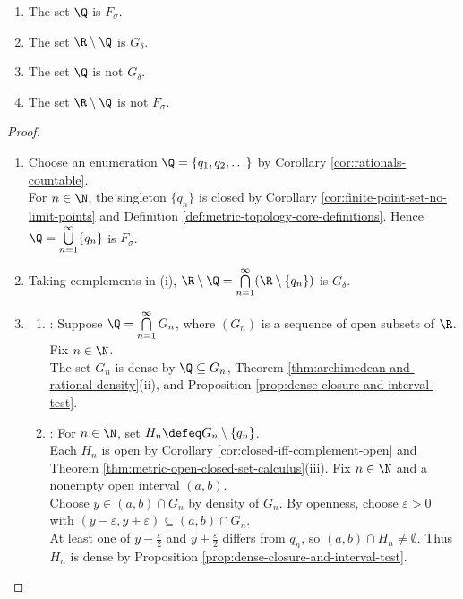 \begin{corollary} \label{cor:rationals-not-gdelta-irrationals-not-fsigma} 
\begin{enumerate}[label=(\roman*)]
\setlength{\itemsep}{0pt}
\item The set $\Q$ is $F_\sigma$.
\item The set $\R\setminus\Q$ is $G_\delta$.
\item The set $\Q$ is not $G_\delta$.
\item The set $\R\setminus\Q$ is not $F_\sigma$.
\end{enumerate}
\begin{proof}
\begin{enumerate}[label=(\roman*)]
\setlength{\itemsep}{0pt}
\item Choose an enumeration $\Q=\{q_1,q_2,\ldots\}$ by Corollary \ref{cor:rationals-countable}.\\
For $n\in\N$, the singleton $\{q_n\}$ is closed by Corollary \ref{cor:finite-point-set-no-limit-points} and Definition \ref{def:metric-topology-core-definitions}. Hence $\Q=\bigcup\limits_{n=1}^{\infty}\{q_n\}$ is $F_\sigma$.
\item Taking complements in (i), $\R\setminus\Q=\bigcap\limits_{n=1}^{\infty}(\R\setminus\{q_n\})$ is $G_\delta$.
\item
\begin{enumerate}[label=(\alph*)]
\setlength{\itemsep}{0pt}
\item {}: Suppose $\Q=\bigcap\limits_{n=1}^{\infty}G_n$, where $(G_n)$ is a sequence of open subsets of $\R$. Fix $n\in\N$.\\
The set $G_n$ is dense by $\Q\subseteq G_n$, Theorem \ref{thm:archimedean-and-rational-density}(ii), and Proposition \ref{prop:dense-closure-and-interval-test}.
\item {}: For $n\in\N$, set $H_n\defeq G_n\setminus\{q_n\}$.\\
Each $H_n$ is open by Corollary \ref{cor:closed-iff-complement-open} and Theorem \ref{thm:metric-open-closed-set-calculus}(iii). Fix $n\in\N$ and a nonempty open interval $(a,b)$.\\
Choose $y\in(a,b)\cap G_n$ by density of $G_n$. By openness, choose $\varepsilon>0$ with $(y-\varepsilon,y+\varepsilon)\subseteq(a,b)\cap G_n$.\\
At least one of $y-\frac{\varepsilon}{2}$ and $y+\frac{\varepsilon}{2}$ differs from $q_n$, so $(a,b)\cap H_n\ne\emptyset$. Thus $H_n$ is dense by Proposition \ref{prop:dense-closure-and-interval-test}.

\end{enumerate}
\end{enumerate}
\end{proof}
\end{corollary}

